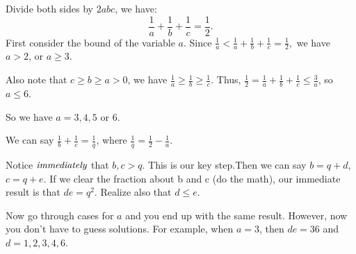 \begin{enumerate}
 Divide both sides by $2abc$, we have: 
 \[\frac{1}{a}+\frac{1}{b}+\frac{1}{c}=\frac{1}{2}.\]First consider the bound of the variable $a$. Since $\frac{1}{a}<\frac{1}{a}+\frac{1}{b}+\frac{1}{c}=\frac{1}{2},$ we have $a>2$, or $a\ge 3$.

 Also note that $c\ge b\ge a>0$, we have $\frac{1}{a}\ge \frac{1}{b}\ge \frac{1}{c}$. Thus, $\frac{1}{2}=\frac{1}{a}+\frac{1}{b}+\frac{1}{c}\le \frac{3}{a}$, so $a\le 6$.

 So we have $a=3, 4, 5$ or $6$.

 
We can say $\frac{1}{b}+\frac{1}{c}=\frac{1}{q}$, where $\frac{1}{q} = \frac{1}{2}-\frac{1}{a}$.

 Notice $\emph{\text{immediately}}$ that $b, c > q$. This is our key step.Then we can say $b=q+d$, $c=q+e$. If we clear the fraction about b and c (do the math), our immediate result is that $de = q^2$. Realize also that $d \leq e$. 

 Now go through cases for $a$ and you end up with the same result. However, now you don't have to guess solutions. For example, when $a=3$, then $de = 36$ and $d=1, 2, 3, 4, 6$.

 


 


 


\end{enumerate}